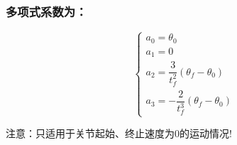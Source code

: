 \subsubsection{多项式系数为：}
$$
\begin{cases} 
a_0 = \theta_0 \\ 
a_1 = 0 \\
a_2 = \dfrac{3}{t_f^2}\left(\theta_f-\theta_0\right) \\
a_3 = -\dfrac{2}{t_f^3}\left(\theta_f-\theta_0\right)
\end{cases}
$$
\begin{note}
    注意：只适用于关节起始、终止速度为0的运动情况!
\end{note}

